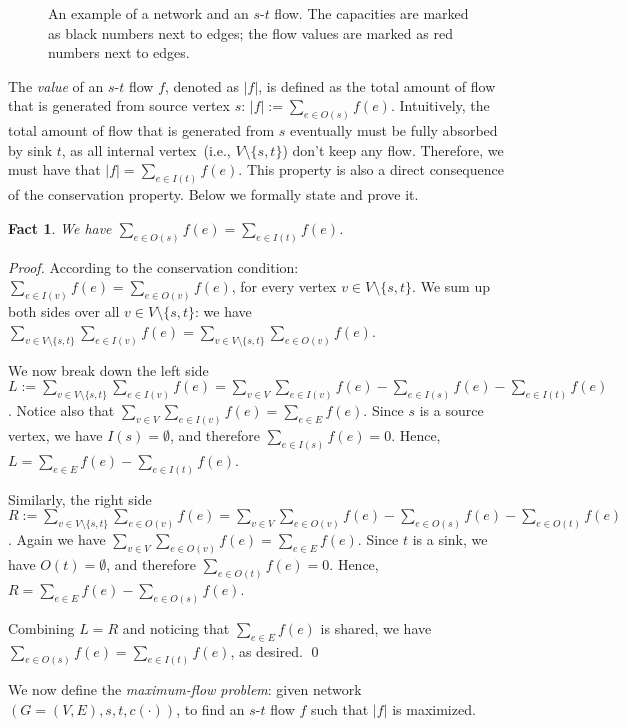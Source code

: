 \documentclass[letterpaper,11pt]{article}
\theoremstyle{mytheorem}
\newtheorem{fact}{Fact}
\begin{document}
\begin{figure}[h]
\centering{}
\caption{An example of a network and an $s$-$t$ flow.
The capacities are marked as black numbers next to edges;
the flow values are marked as red numbers next to edges.}
\label{fig:flow}
\end{figure}

The \emph{value} of an $s$-$t$ flow $f$, denoted as $|f|$,
is defined as the total amount of flow that is generated from source vertex $s$:
$|f| := \sum_{e\in O(s)} f(e)$. Intuitively, the total amount of flow that is generated
from $s$ eventually must be fully absorbed by sink $t$, as all internal vertex~(i.e., $V\setminus\{s,t\}$)
don't keep any flow. Therefore, we must have that 
$|f| = \sum_{e\in I(t)} f(e)$.  
This property is also a direct consequence of the conservation property.
Below we formally state and prove it.

\begin{fact}
We have $\sum_{e\in O(s)} f(e) = \sum_{e\in I(t)} f(e)$. 
\end{fact}

\emph{Proof.} According to the conservation condition:
$\sum_{e\in I(v)} f(e) = \sum_{e\in O(v)} f(e)$, 
for every vertex $v\in V\setminus\{s,t\}$. 
We sum up both sides over all $v\in V\setminus\{s,t\}$: 
we have $\sum_{v\in V\setminus\{s,t\}} \sum_{e\in I(v)} f(e) = \sum_{v\in V\setminus\{s,t\}} \sum_{e\in O(v)} f(e)$. 

We now break down the left side 
$L := \sum_{v\in V\setminus\{s,t\}} \sum_{e\in I(v)} f(e) 
= \sum_{v\in V} \sum_{e\in I(v)} f(e) -  \sum_{e\in I(s)} f(e) - \sum_{e\in I(t)} f(e)$.
Notice also that $\sum_{v\in V} \sum_{e\in I(v)} f(e) = \sum_{e\in E} f(e)$.
Since $s$ is a source vertex, we have $I(s) = \emptyset$, and therefore $\sum_{e\in I(s)} f(e)  = 0$.
Hence, $L = \sum_{e\in E} f(e) - \sum_{e\in I(t)} f(e)$.

Similarly, the right side 
$R := \sum_{v\in V\setminus\{s,t\}} \sum_{e\in O(v)} f(e) 
= \sum_{v\in V} \sum_{e\in O(v)} f(e) -  \sum_{e\in O(s)} f(e) - \sum_{e\in O(t)} f(e)$.
Again we have $\sum_{v\in V} \sum_{e\in O(v)} f(e) = \sum_{e\in E} f(e)$.
Since $t$ is a sink, we have $O(t) = \emptyset$, and therefore $\sum_{e\in O(t)} f(e)  = 0$.
Hence, $R = \sum_{e\in E} f(e) - \sum_{e\in O(s)} f(e)$.

Combining $L = R$ and noticing that $\sum_{e\in E} f(e)$ is shared, we have $\sum_{e\in O(s)} f(e) = \sum_{e\in I(t)} f(e)$, as desired.  \qed

We now define the \emph{maximum-flow problem}: given network $(G= (V, E), s, t, c(\cdot))$,
to find an $s$-$t$ flow $f$ such that $|f|$ is maximized.
\end{document}
